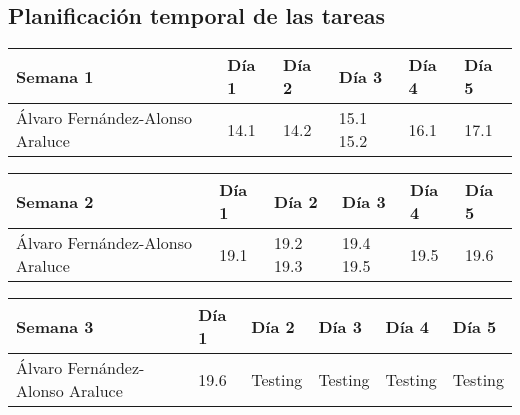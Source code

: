 \subsection{Planificación temporal de las tareas}

\begin{table}[h]
	\centering
	\begin{tabular}{| p{2cm} | p{2cm} | p{2cm} | p{2cm} | p{2cm} | p{2cm} |}
		\rowcolor[HTML]{329A9D} 
		 {\color[HTML]{FFFFFF} \textbf{Semana 1}} & {\color[HTML]{FFFFFF} \textbf{Día 1}} & {\color[HTML]{FFFFFF} \textbf{Día 2}} & {\color[HTML]{FFFFFF} \textbf{Día 3}} & {\color[HTML]{FFFFFF} \textbf{Día 4}}  & {\color[HTML]{FFFFFF} \textbf{Día 5}} \\ \hline
		Álvaro Fernández-Alonso Araluce & 14.1 & 14.2 & 15.1 15.2 & 16.1 & 17.1 \\ \hline
	\end{tabular}
\end{table}

\begin{table}[h]
	\centering
	\begin{tabular}{| p{2cm} | p{2cm} | p{2cm} | p{2cm} | p{2cm} | p{2cm} |}
		\rowcolor[HTML]{329A9D} 
		{\color[HTML]{FFFFFF} \textbf{Semana 2}} & {\color[HTML]{FFFFFF} \textbf{Día 1}} & {\color[HTML]{FFFFFF} \textbf{Día 2}} & {\color[HTML]{FFFFFF} \textbf{Día 3}} & {\color[HTML]{FFFFFF} \textbf{Día 4}}  & {\color[HTML]{FFFFFF} \textbf{Día 5}} \\ \hline
		Álvaro Fernández-Alonso Araluce & 19.1 & 19.2 19.3 & 19.4 19.5 & 19.5 & 19.6 \\ \hline
	\end{tabular}
\end{table}

\begin{table}[h]
	\centering
	\begin{tabular}{| p{2cm} | p{2cm} | p{2cm} | p{2cm} | p{2cm} | p{2cm} |}
		\rowcolor[HTML]{329A9D} 
		{\color[HTML]{FFFFFF} \textbf{Semana 3}} & {\color[HTML]{FFFFFF} \textbf{Día 1}} & {\color[HTML]{FFFFFF} \textbf{Día 2}} & {\color[HTML]{FFFFFF} \textbf{Día 3}} & {\color[HTML]{FFFFFF} \textbf{Día 4}}  & {\color[HTML]{FFFFFF} \textbf{Día 5}} \\ \hline
		Álvaro Fernández-Alonso Araluce & 19.6 & Testing & Testing & Testing & Testing \\ \hline
	\end{tabular}
\end{table}

